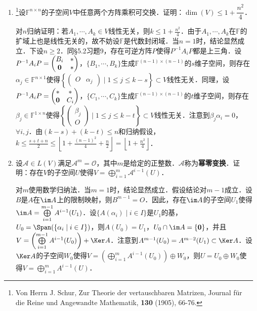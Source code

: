 

\begin{enumerate}
\item \footnote{Von Herrn J. Schur, Zur Theorie der vertauschbaren Matrizen, Journal f\"ur die Reine und Angewandte Mathematik, {\bf 130} (1905), 66-76.}设$\mathbb{F}^{n\times n}$的子空间$V$中任意两个方阵乘积可交换．证明：$\dim(V)\le 1+\dfrac{n^2}{4}$．

对$n$归纳证明：若$A_1,\cdots,A_k\in V$线性无关，则$k\le 1+\frac{n^2}{4}$．由于$A_1,\cdots,A_k$在$\mathbb{F}$的扩域上也是线性无关的，故不妨设$\mathbb{F}$是代数封闭域．当$n=1$时，结论显然成立．下设$n\ge 2$．同\S5.2习题9，存在可逆方阵$P$使得$P^{-1}A_iP$都是上三角．设$P^{-1}A_iP=\begin{pmatrix}B_i&* \\ {\bf 0}&*\end{pmatrix}$，$\{B_1,\cdots,B_k\}$生成$\mathbb{F}^{(n-1)\times(n-1)}$的$s$维子空间，则存在$\alpha_j\in\mathbb{F}^{n\times 1}$使得$\left\{\begin{pmatrix}O&\alpha_j\end{pmatrix}\mid 1\le j\le k-s\right\}\subset V$线性无关．同理，设$P^{-1}A_iP=\begin{pmatrix}*&* \\ {\bf 0}&C_i\end{pmatrix}$，$\{C_1,\cdots,C_k\}$生成$\mathbb{F}^{(n-1)\times(n-1)}$的$t$维子空间，则存在$\beta_j\in\mathbb{F}^{1\times n}$使得$\left\{\begin{pmatrix}\beta_j \\ O\end{pmatrix}\mid 1\le j\le k-t\right\}\subset V$线性无关．注意到$\beta_j\alpha_i=0$，$\forall i,j$．由$(k-s)+(k-t)\le n$和归纳假设，$k\le\frac{s+t+n}{2}\le\left\lfloor 1+\frac{(n-1)^2}{4}+\frac{n}{2}\right\rfloor=\left\lfloor 1+\frac{n^2}{4}\right\rfloor$．

\item 设$\mathcal{A}\in L(V)$满足$\mathcal{A}^m=\mathcal{O}$，其中$m$是给定的正整数．$\mathcal{A}$称为{\bf 幂零变换}．证明：存在$V$的子空间$U$使得$V=\bigoplus\limits_{i=1}^m\mathcal{A}^{i-1}(U)$．

对$m$使用数学归纳法．当$m=1$时，结论显然成立．假设结论对$m-1$成立．设$B$是$A$在$\im A$上的限制映射，则$B^{m-1}=O$．因此，存在$\im A$的子空间$U_1$使得$\im A=\bigoplus\limits_{i=1}^{m-1}A^{i-1}(U_1)$．设$\{A(\alpha_i)\mid i\in I\}$是$U_1$的基，$U_0=\Span(\{\alpha_i\mid i\in I\})$，则$A(U_0)=U_1$，$U_0\cap\im A=\{{\bf 0}\}$，并且$V=\left(\bigoplus\limits_{i=1}^{m-1}A^{i-1}(U_0)\right)+\Ker A$．注意到$A^{m-1}(U_0)=A^{m-2}(U_1)\subset\Ker A$．设$\Ker A$的子空间$W_0$使得$V=\left(\bigoplus\limits_{i=1}^mA^{i-1}(U_0)\right)\oplus W_0$，则$U=U_0\oplus W_0$使得$V=\bigoplus\limits_{i=1}^mA^{i-1}(U)$．
\end{enumerate}

